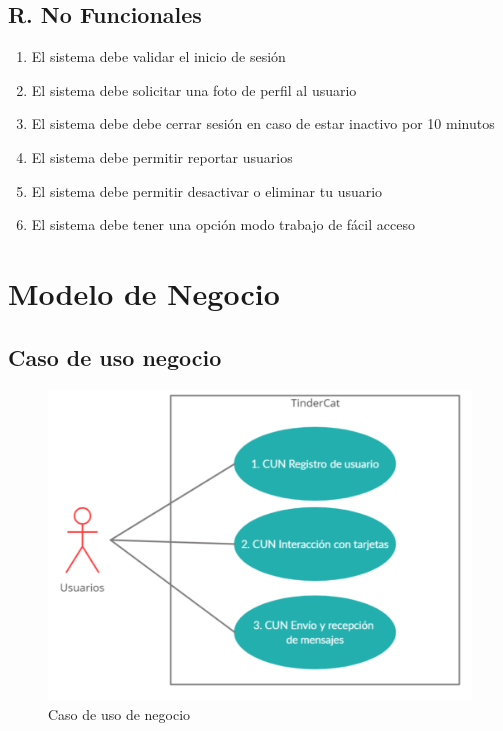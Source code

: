 \documentclass{article}
\begin{document}
\subsection{R. No Funcionales}
\begin{enumerate}
    \item El sistema debe validar el inicio de sesión
    \item El sistema debe solicitar una foto de perfil al usuario
    \item El sistema debe debe cerrar sesión en caso de estar inactivo por 10 minutos
    \item El sistema debe permitir reportar usuarios
    \item El sistema debe permitir desactivar o eliminar tu usuario
    \item El sistema debe tener una opción modo trabajo de fácil acceso
\end{enumerate}
\clearpage
\section{Modelo de Negocio}
\subsection{Caso de uso negocio}
\vspace{5mm}
\begin{figure}[h]
    \begin{center}
        \includegraphics[width=\textwidth]{images/Caso de uso negocio.png}
        \caption{Caso de uso de negocio}
    \end{center}
\end{figure}    
\end{document}
